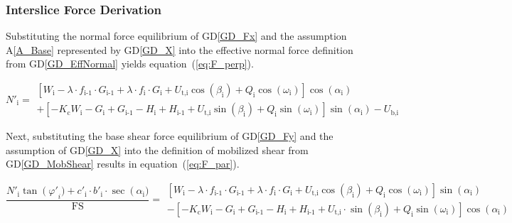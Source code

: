 \documentclass[12pt]{article}
\newcommand{\aref}[1]{A\ref{#1}}
\newcommand{\dref}[1]{GD\ref{#1}}
\begin{document}

\subsubsection*{Interslice Force Derivation} \label{sec:Ederivation}

Substituting the normal force equilibrium of \dref{GD_Fx} and the assumption 
\aref{A_Base} represented by \dref{GD_X} into the effective normal force 
definition from \dref{GD_EffNormal} yields equation~(\ref{eq:F_perp}).

\begin{equation}\label{eq:F_perp}   N'_{\text{i}}  = \begin{array}{l}    
    \left[ W_{\text{i}} - \lambda \cdot f_{\text{i-1}} \cdot
      G_{\text{i-1}} + \lambda \cdot f_{\text{i}} \cdot G_{\text{i}} +
      U_{\text{t,i}} {\cos\left(\beta_{\text{i}}\right)} +
      Q_{\text{i}} \cos\left(\omega_{\text{i}}\right)
      \right]\cos\left(\alpha_{\text{i}}\right) \\ + \left[
      -K_{\text{c}} W_{\text{i}} - G_{\text{i}} + G_{\text{i-1}} -
      H_{\text{i}} + H_{\text{i-1}} + U_{\text{t,i}}
      \sin\left(\beta_{\text{i}}\right) + Q_{\text{i}}
      \sin\left(\omega_{\text{i}}\right) \right]
    \sin\left(\alpha_{\text{i}}\right) - U_{\text{b,i}} \end{array}
\end{equation}

\noindent
Next, substituting the base shear force equilibrium of \dref{GD_Fy} and the 
assumption of \dref{GD_X} into the definition of mobilized shear from 
\dref{GD_MobShear} results in equation~(\ref{eq:F_par}).

\begin{equation}  \label{eq:F_par}
  \frac{
   N'_{\text{i}} \tan\left(\varphi'\right._{i}) + c'_{\text{i}} \cdot 
   b'_{\text{i}} \cdot \sec\left(\alpha_{\text{i}}\right.) 
  }
    { \text{FS} }
     = \begin{array}{l}
      \left[ W_{\text{i}}
       - \lambda \cdot
    
      f_{\text{i-1}} \cdot G_{\text{i-1}} + \lambda \cdot f_{\text{i}}
      \cdot G_{\text{i}} + U_{\text{t,i}}
      \cos\left(\beta_{\text{i}}\right) + Q_{\text{i}}
      \cos\left(\omega_{\text{i}}\right) \right]
    \sin\left(\alpha_{\text{i}}\right) \\ - \left[ -K_{\text{c}}
      W_{\text{i}} - G_{\text{i}} + G_{\text{i-1}} - H_{\text{i}} +
      H_{\text{i-1}} + U_{\text{t,i}} \cdot
      \sin\left(\beta_{\text{i}}\right) + Q_{\text{i}}
      \sin\left(\omega_{\text{i}}\right) \right]
    \cos\left(\alpha_{\text{i}}\right) \end{array}
\end{equation}
\end{document}
